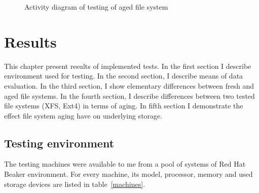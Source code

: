 \documentclass[
  color, %
  table, %
  lof,   %
  lot,   %
]{fithesis3}
\begin{document}
\begin{figure}[ht]
    \centering
    \caption{Activity diagram of testing of aged file system}
    \label{fig:rec_activity}
\end{figure}







\chapter{Results}
\label{results}
This chapter present results of implemented tests. In the first section I describe environment used for testing. In the second section, I describe means of data evaluation. In the third section, I show elementary differences between fresh and aged file systems. In the fourth section, I describe differences between two tested file systems (XFS, Ext4) in terms of aging. In fifth section I demonstrate the effect file system aging have on underlying storage.

\section{Testing environment}
The testing machines were available to me from a pool of systems of Red Hat Beaker environment. For every machine, its model, processor, memory and used storage devices are listed in table~\ref{machines}.
\end{document}
